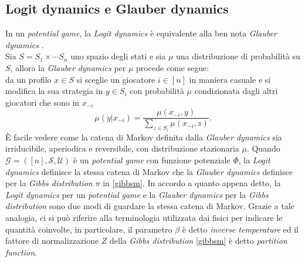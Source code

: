 \subsection{Logit dynamics e Glauber dynamics}\label{ssec:logitglauber}
In un \textit{potential game}, la \textit{Logit dynamics} è equivalente alla ben nota \textit{Glauber dynamics} \cite{martinelli1999lectures}.\\
Sia $S = S_1 \times \cdots S_n$ uno spazio degli stati e sia $\mu$ una distribuzione di probabilità su $S$, allora la \textit{Glauber dynamics} per $\mu$ procede come segue:\\
da un profilo $x \in S$ si sceglie un giocatore $i \in [n]$ in maniera casuale e si modifica la sua strategia in $y \in S_i$ con probabilità $\mu$ condizionata dagli altri giocatori che sono in $x_{-i}$
\begin{equation}
	\mu(y|x_{-i}) = \frac{\mu(x_{-i}, y)}{\sum_{z\in S_i}{\mu(x_{-i}, z)}}.
\end{equation}
È facile vedere come la catena di Markov definita dalla \textit{Glauber dynamics} sia irriducibile, aperiodica e reversibile, con distribuzione stazionaria $\mu$. Quando $\mathcal{G}=([n], \mathcal{S}, \mathcal{U})$ è un \textit{potential game} con funzione potenziale $\Phi$, la \textit{Logit dynamics} definisce la stessa catena di Markov che la \textit{Glauber dynamics} definisce per la \textit{Gibbs distribution} $\pi$ in \ref{gibbsm}.
In accordo a quanto appena detto, la \textit{Logit dynamics} per un \textit{potential game} e la \textit{Glauber dynamics} per la \textit{Gibbs distribution} sono due modi di guardare la stessa catena di Markov. Grazie a tale analogia, ci si può riferire alla terminologia utilizzata dai fisici per indicare le quantità coinvolte, in particolare, il parametro $\beta$ è detto \textit{inverse temperature} ed il fattore di normalizzazione $Z$ della \textit{Gibbs distribution} \ref{gibbsm} è detto \textit{partition function}.
